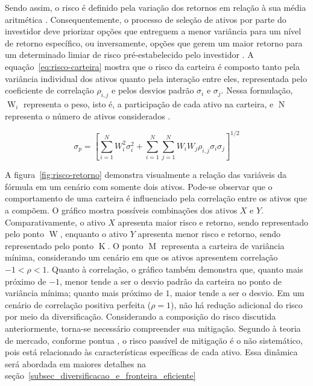 Sendo assim, o risco é definido pela variação dos retornos em relação à sua média aritmética \cite{jeleskovic2024cryptocurrency}. Consequentemente, o processo de seleção de ativos por parte do investidor deve priorizar opções que entreguem a menor variância para um nível de retorno específico, ou inversamente, opções que gerem um maior retorno para um determinado limiar de risco pré-estabelecido pelo investidor \cite{paiva2019decision}. A equação~\ref{eq:risco-carteira} mostra que o risco da carteira é composto tanto pela variância individual dos ativos quanto pela interação entre eles, representada pelo coeficiente de correlação \(\rho_{i,j}\) e pelos desvios padrão \(\sigma_i\) e \(\sigma_j\). Nessa formulação, \(\operatorname{W}_i\) representa o peso, isto é, a participação de cada ativo na carteira, e \(\operatorname{N}\) representa o número de ativos considerados \cite{assaf2014financas}.

\begin{equation}
  \label{eq:risco-carteira}
  \sigma_p =
  \left[
  \sum_{i=1}^{N} W_i^2 \sigma_i^2
  +
  \sum_{i=1}^{N}
  \sum_{j=1}^{N}
  W_i W_j \rho_{i,j}\sigma_i\sigma_j
  \right]^{1/2}
\end{equation}

A figura~\ref{fig:risco-retorno} demonstra visualmente a relação das variáveis da fórmula em um cenário com somente dois ativos. Pode-se observar que o comportamento de uma carteira é influenciado pela correlação entre os ativos que a compõem. O gráfico mostra possíveis combinações dos ativos $X$ e $Y$. Comparativamente, o ativo $X$ apresenta maior risco e retorno, sendo representado pelo ponto \(\operatorname{W}\), enquanto o ativo $Y$ apresenta menor risco e retorno, sendo representado pelo ponto \(\operatorname{K}\). O ponto \(\operatorname{M}\) representa a carteira de variância mínima, considerando um cenário em que os ativos apresentem correlação \(-1<\rho<1\). Quanto à correlação, o gráfico também demonstra que, quanto mais próximo de $-1$, menor tende a ser o desvio padrão da carteira no ponto de variância mínima; quanto mais próximo de $1$, maior tende a ser o desvio. Em um cenário de correlação positiva perfeita ($\rho=1$), não há redução adicional do risco por meio da diversificação. Considerando a composição do risco discutida anteriormente, torna-se necessário compreender sua mitigação. Segundo à teoria de mercado, conforme pontua , o risco passível de mitigação é o não sistemático, pois está relacionado às características específicas de cada ativo. Essa dinâmica será abordada em maiores detalhes na seção~\ref{subsec_diversificacao_e_fronteira_eficiente}

